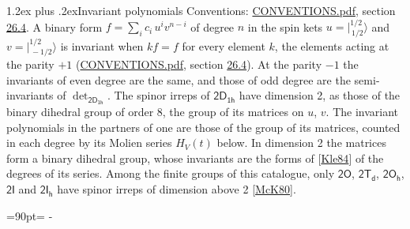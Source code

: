 \documentclass[10pt,a4paper]{article}
\makeatletter
\renewcommand\section{\@startsection{section}{1}{\z@}{-3ex plus -1ex minus -.2ex}%
  {1.2ex plus .2ex}{\normalfont\large\sffamily\bfseries\color{parttitle}}}
\newcommand{\needspace}[1]{\par\penalty-100\begingroup\dimen0=#1\relax\dimen2=\pagegoal
  \advance\dimen2-\pagetotal\ifdim\dimen0>\dimen2\relax\ifdim\dimen2>0pt\vfil\break\fi\fi
  \endgroup}
\numberwithin{equation}{section}
\newcommand{\grp}[1]{\mathsf{#1}}
\newcommand{\jm}[2]{\bigl\lvert{}^{#1}_{\,#2}\bigr\rangle}
\makeatother
\begin{document}
\section{Invariant polynomials}\label{s:invariants}
Conventions: \href{../../CONVENTIONS.pdf}{CONVENTIONS.pdf}, section \href{../../CONVENTIONS.pdf\#conv.26.4}{26.4}.
\leavevmode\label{n:local.binary.form}A binary form $f = \sum_i c_i\, u^i v^{n-i}$ of degree $n$ in the spin kets $u = \jm{1/2}{1/2}$ and $v = \jm{1/2}{-1/2}$ is invariant when $k f = f$ for every element $k$, the elements acting at the parity $+1$ (\href{../../CONVENTIONS.pdf}{CONVENTIONS.pdf}, section \href{../../CONVENTIONS.pdf\#conv.26.4}{26.4}). At the parity $-1$ the invariants of even degree are the same, and those of odd degree are the semi-invariants of $\det_{\grp{2D_{1h}}}$.
The spinor irreps of $\grp{2D_{1h}}$ have dimension 2, as those of the binary dihedral group of order 8, the group of its matrices on $u$, $v$. \label{n:function.hilbert}The invariant polynomials in the partners of one are those of the group of its matrices, counted in each degree by its Molien series $H_V(t)$ below. In dimension 2 the matrices form a binary dihedral group, whose invariants are the forms of [\href{../../../REFERENCES.pdf\#ref.Kle84}{Kle84}] of the degrees of its series. Among the finite groups of this catalogue, only $\grp{2O}$, $\grp{2T_{d}}$, $\grp{2O_{h}}$, $\grp{2I}$ and $\grp{2I_{h}}$ have spinor irreps of dimension above 2 [\href{../../../REFERENCES.pdf\#ref.McK80}{McK80}].
\needspace{90pt}
\end{document}
